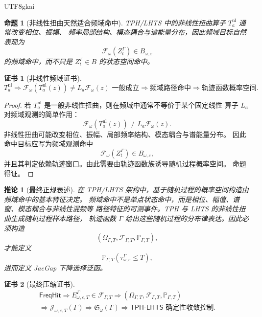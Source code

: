\documentclass[12pt]{article}
\newtheorem{proposition}{命题}[section]
\newtheorem{corollary}{推论}[section]
\newtheorem{Certificate}{证书}[section]
\newcommand{\TPHLHTS}{\ensuremath{\mathsf{TPH\mbox{-}LHTS}}}
\newcommand{\Prob}{\mathbb P}
\begin{document}
\begin{CJK*}{UTF8}{gkai}
\begin{proposition}[非线性扭曲天然适合频域命中]
TPH/LHTS 中的非线性扭曲算子 \(T_a^{\mathrm{nl}}\) 通常改变相位、振幅、
频率局部结构、模态耦合与谱能量分布，因此频域目标自然表现为
\[
\mathcal F_\omega(Z_t^\Gamma)\in B_{\omega,\varepsilon}
\]
的频域命中，而不只是 \(Z_t^\Gamma\in B\) 的状态空间命中。
\end{proposition}

\begin{Certificate}[非线性频域证书]
\[
\boxed{
T_a^{\mathrm{nl}}
\Rightarrow
\mathcal F_\omega(T_a^{\mathrm{nl}}(z))
\ne
L_a\mathcal F_\omega(z)\text{ 一般成立}
\Rightarrow
\text{频域路径命中}
\Rightarrow
\text{轨迹函数概率空间}.
}
\]
\end{Certificate}

\begin{proof}
若 \(T_a^{\mathrm{nl}}\) 是一般非线性扭曲，则在频域中通常不等价于某个固定线性
算子 \(L_a\) 对频域观测的简单作用：
\[
\mathcal F_\omega(T_a^{\mathrm{nl}}(z))
\ne
L_a\mathcal F_\omega(z).
\]
非线性扭曲可能改变相位、振幅、局部频率结构、模态耦合与谱能量分布。
因此命中目标应写为频域观测命中
\[
\mathcal F_\omega(Z_t^\Gamma)\in B_{\omega,\varepsilon},
\]
并且其判定依赖轨迹窗口。由此需要由轨迹函数族诱导随机过程概率空间。
命题得证。
\end{proof}

\begin{corollary}[最终正规表述]
在 TPH/LHTS 架构中，基于随机过程的概率空间构造由频域命中的基本特征决定。
频域命中不是单点状态命中，而是相位、幅值、谱窗、模态耦合与非线性混频等
路径特征的可测事件。TPH 与 LHTS 的非线性扭曲生成随机过程样本路径，
轨迹函数 \(\Gamma\) 给出这些随机过程的分布律表达。因此必须构造
\[
(\Omega_{\Gamma,T},\mathscr F_{\Gamma,T},\Prob_{\Gamma,T}),
\]
才能定义
\[
\Prob_{\Gamma,T}(\tau_{\omega,\varepsilon}^{\Gamma}\le T),
\]
进而定义 JacGap 下降选择泛函。
\end{corollary}

\begin{Certificate}[最终压缩证书]
\[
\boxed{
\begin{gathered}
\mathsf{FreqHit}
\Rightarrow
E_{\omega,\varepsilon,T}^{\Gamma}\in\mathscr F_{\Gamma,T}
\Rightarrow
(\Omega_{\Gamma,T},\mathscr F_{\Gamma,T},\Prob_{\Gamma,T})
\\
\Rightarrow
\mathcal J_{\omega,\varepsilon,T}(\Gamma)
\Rightarrow
\mathfrak S_\omega(\Gamma)
\Rightarrow
\TPHLHTS\text{ 确定性收敛控制}.
\end{gathered}
}
\]
\end{Certificate}


\end{CJK*}
\end{document}
